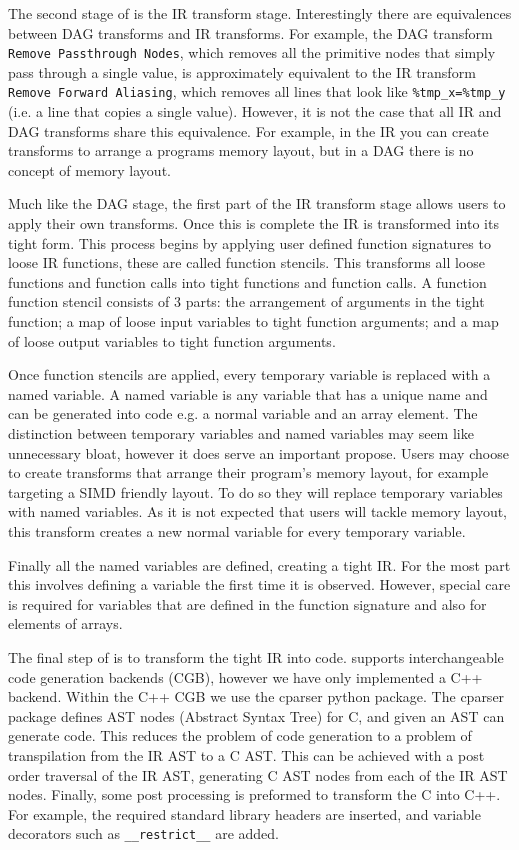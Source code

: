 The second stage of \phlat is the IR transform stage.
Interestingly there are equivalences between DAG transforms and IR transforms.
For example, the DAG transform \texttt{Remove Passthrough Nodes}, which removes all the primitive nodes that simply pass through a single value, is approximately equivalent to the IR transform \texttt{Remove Forward Aliasing}, which removes all lines that look like \lstinline{%tmp_x=%tmp_y} (i.e. a line that copies a single value).
However, it is not the case that all IR and DAG transforms share this equivalence.
For example, in the IR you can create transforms to arrange a programs memory layout, but in a DAG there is no concept of memory layout.

Much like the DAG stage, the first part of the IR transform stage allows users to apply their own transforms.
Once this is complete the IR is transformed into its tight form.
This process begins by applying user defined function signatures to loose IR functions, these are called function stencils.
This transforms all loose functions and function calls into tight functions and function calls.
A function function stencil consists of 3 parts: the arrangement of arguments in the tight function; a map of loose input variables to tight function arguments; and a map of loose output variables to tight function arguments.

Once function stencils are applied, every temporary variable is replaced with a named variable.
A named variable is any variable that has a unique name and can be generated into code e.g. a normal variable and an array element.
The distinction between temporary variables and named variables may seem like unnecessary bloat, however it does serve an important propose.
Users may choose to create transforms that arrange their program's memory layout, for example targeting a SIMD friendly layout.
To do so they will replace temporary variables with named variables.
As it is not expected that users will tackle memory layout, this transform creates a new normal variable for every temporary variable.

Finally all the named variables are defined, creating a tight IR.
For the most part this involves defining a variable the first time it is observed.
However, special care is required for variables that are defined in the function signature and also for elements of arrays.

The final step of \phlat is to transform the tight IR into code.
\phlat supports interchangeable code generation backends (CGB), however we have only implemented a C++ backend.
Within the C++ CGB we use the cparser python package.
The cparser package defines AST nodes (Abstract Syntax Tree) for C, and given an AST can generate code.
This reduces the problem of code generation to a problem of transpilation from the IR AST to a C AST.
This can be achieved with a post order traversal of the IR AST, generating C AST nodes from each of the IR AST nodes.
Finally, some post processing is preformed to transform the C into C++.
For example, the required standard library headers are inserted, and variable decorators such as \lstinline{__restrict__} are added.  

